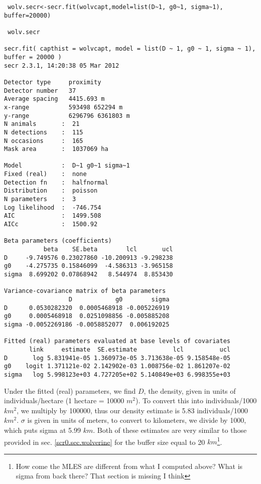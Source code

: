 {\small
\begin{verbatim}
 wolv.secr<-secr.fit(wolvcapt,model=list(D~1, g0~1, sigma~1), buffer=20000)

 wolv.secr

secr.fit( capthist = wolvcapt, model = list(D ~ 1, g0 ~ 1, sigma ~ 1), buffer = 20000 )
secr 2.3.1, 14:20:38 05 Mar 2012

Detector type     proximity 
Detector number   37 
Average spacing   4415.693 m 
x-range           593498 652294 m 
y-range           6296796 6361803 m 
N animals       :  21  
N detections    :  115 
N occasions     :  165 
Mask area       :  1037069 ha 

Model           :  D~1 g0~1 sigma~1 
Fixed (real)    :  none 
Detection fn    :  halfnormal 
Distribution    :  poisson 
N parameters    :  3 
Log likelihood  :  -746.754 
AIC             :  1499.508 
AICc            :  1500.92 

Beta parameters (coefficients) 
           beta    SE.beta        lcl       ucl
D     -9.749576 0.23027860 -10.200913 -9.298238
g0    -4.275735 0.15846099  -4.586313 -3.965158
sigma  8.699202 0.07868942   8.544974  8.853430

Variance-covariance matrix of beta parameters 
                  D            g0        sigma
D      0.0530282320  0.0005468918 -0.005226919
g0     0.0005468918  0.0251098856 -0.005885208
sigma -0.0052269186 -0.0058852077  0.006192025

Fitted (real) parameters evaluated at base levels of covariates 
       link     estimate  SE.estimate          lcl          ucl
D       log 5.831941e-05 1.360973e-05 3.713638e-05 9.158548e-05
g0    logit 1.371121e-02 2.142902e-03 1.008756e-02 1.861207e-02
sigma   log 5.998123e+03 4.727205e+02 5.140849e+03 6.998355e+03
\end{verbatim}
}

Under the fitted (real) parameters, we find $D$, the density, given in
units of individuals/hectare (1 hectare = 10000 $m^2$).  To convert this
into individuals/1000 $km^2$, we multiply by 100000, thus our density
estimate is 5.83 individuals/1000 $km^2$.  $\sigma$ is given in units of
meters, to convert to kilometers, we divide by 1000, which puts sigma
at 5.99 $km$.  Both of these estimates are very similar to those
provided in sec. \ref{scr0.sec.wolverine} for the buffer size equal to
20 $km$\footnote{How come the MLES are different from what I computed
  above?  What is sigma from back there? That section is missing
  I think}.


